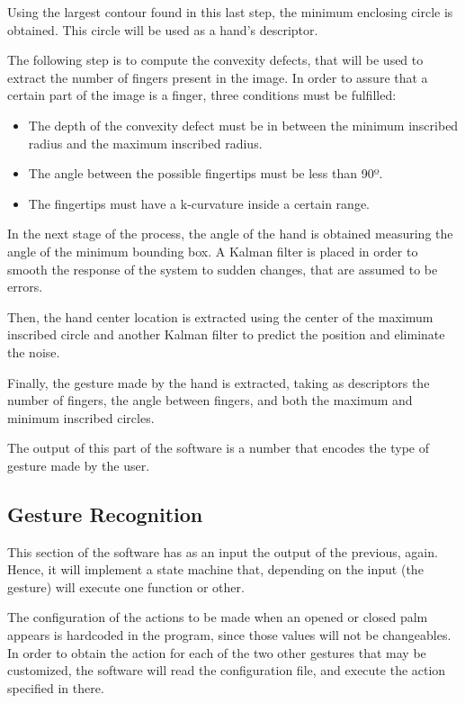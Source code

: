 \documentclass{article}
\begin{document}
Using the largest contour found in this last step, the minimum enclosing circle is obtained. This circle will be used as a hand's descriptor.

The following step is to compute the convexity defects, that will be used to extract the number of fingers present in the image. 
In order to assure that a certain part of the image is a finger, three conditions must be fulfilled: 
\begin{itemize}
\item The depth of the convexity defect must be in between the minimum inscribed radius and the maximum inscribed radius. 
\item The angle between the possible fingertips must be less than 90º. 
\item The fingertips must have a k-curvature inside a certain range.
\end{itemize}

In the next stage of the process, the angle of the hand is obtained measuring the angle of the minimum bounding box. A Kalman filter is placed in order to smooth the response of the system to sudden changes, that are assumed to be errors. 

Then, the hand center location is extracted using the center of the maximum inscribed circle and another Kalman filter to predict the position and eliminate the noise. 

Finally, the gesture made by the hand is extracted, taking as descriptors the number of fingers, the angle between fingers, and both the maximum and minimum inscribed circles. 

The output of this part of the software is a number that encodes the type of gesture made by the user.


\subsection{Gesture Recognition} 
This section of the software has as an input the output of the previous, again. Hence, it will implement a state machine that, depending on the input (the gesture) will execute one function or other. 

The configuration of the actions to be made when an opened or closed palm appears is hardcoded in the program, since those values will not be changeables. In order to obtain the action for each of the two other gestures that may be customized, the software will read the configuration file, and execute the action specified in there. 
\end{document}
